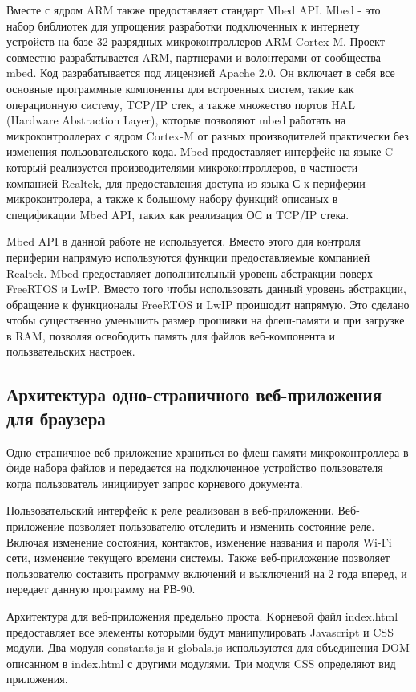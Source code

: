 Вместе с ядром ARM также предоставляет стандарт Mbed API.
Mbed - это набор библиотек для упрощения разработки подключенных к интернету устройств на базе 32-разрядных микроконтроллеров ARM Cortex-M. Проект совместно разрабатывается ARM, партнерами и волонтерами от сообщества mbed. Код разрабатывается под лицензией Apache 2.0. Он включает в себя все основные программные компоненты для встроенных систем, такие как операционную систему, TCP/IP стек, а также множество портов HAL (Hardware Abstraction Layer), которые позволяют mbed работать на микроконтроллерах с ядром Cortex-M от разных производителей практически без изменения пользовательского кода.
Mbed предоставляет интерфейс на языке C который реализуется производителями микроконтроллеров, в частности компанией Realtek, для предоставления доступа из языка С к периферии микроконтролера, а также к большому набору функций описаных в спецификации Mbed API, таких как реализация ОС и TCP/IP стека. 

Mbed API в данной работе не используется. Вместо этого для контроля периферии напрямую используются функции предоставляемые компанией Realtek. Mbed предоставляет дополнительный уровень абстракции поверх FreeRTOS и LwIP. Вместо того чтобы использовать данный уровень абстракции, обращение к функционалы FreeRTOS и LwIP проишодит напрямую. Это сделано чтобы существенно уменьшить размер прошивки на флеш-памяти и при загрузке в RAM, позволяя освободить память для файлов веб-компонента и пользвательских настроек. 


\newpage
\subsection{Архитектура одно-страничного веб-приложения для браузера}
Одно-страничное веб-приложение храниться во флеш-памяти микроконтроллера в фиде набора файлов и передается на подключенное устройство пользователя когда пользователь инициирует запрос корневого документа.

Пользовательский интерфейс к реле реализован в веб-приложении. Веб-приложение позволяет пользователю отследить и изменить состояние реле. Включая изменение состояния, контактов, изменение названия и пароля Wi-Fi сети, изменение текущего времени системы. Также веб-приложение позволяет пользователю составить программу включений и выключений на 2 года вперед, и передает данную программу на РВ-90.

Архитектура для веб-приложения предельно проста. Kорневой файл index.html предоставляет все элементы которыми будут манипулировать Javascript и CSS модули. Два модуля constants.js и globals.js используются для объединения DOM описанном в index.html с другими модулями. Три модуля CSS определяют вид приложения.

